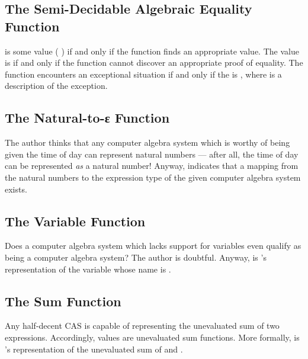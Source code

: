 \documentclass{report}
\begin{document}
\subsection{The Semi-Decidable Algebraic Equality Function}
    is some value  \AgdaSymbol( \AgdaSymbol) if and only if the  function finds an appropriate value.  The  value is   if and only if the function cannot discover an appropriate proof of equality.  The function encounters an exceptional situation if and only if the  is  , where  is a description of the exception.

\subsection{The Natural-to-ε Function}
The author thinks that any computer algebra system which is worthy of being given the time of day can represent natural numbers --- after all, the time of day can be represented \emph{as} a natural number!  Anyway,  indicates that a mapping from the natural numbers to the expression type of the given computer algebra system exists.

\subsection{The Variable Function}
Does a computer algebra system which lacks support for variables even qualify as being a computer algebra system?  The author is doubtful.  Anyway,    is 's representation of the variable whose name is .

\subsection{The Sum Function}
Any half-decent CAS is capable of representing the unevaluated sum of two expressions.  Accordingly, \AgdaField{\AgdaUnderscore{}+\AgdaUnderscore{}} values are unevaluated sum functions.  More formally,     is 's representation of the unevaluated sum of  and .
\end{document}

